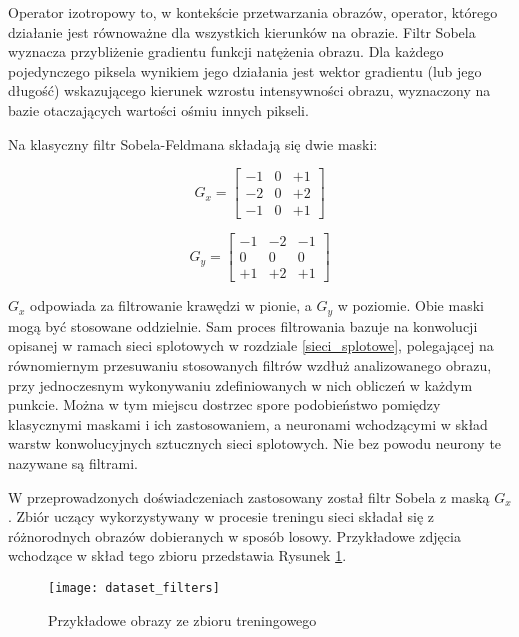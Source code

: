     Operator izotropowy to, w kontekście przetwarzania obrazów, operator, którego
    działanie jest równoważne dla wszystkich kierunków na obrazie. Filtr Sobela
    wyznacza przybliżenie gradientu funkcji natężenia obrazu. Dla każdego pojedynczego
    piksela wynikiem jego działania jest wektor gradientu (lub jego długość) wskazującego kierunek wzrostu
    intensywności obrazu, wyznaczony na bazie otaczających wartości ośmiu innych pikseli.

    Na klasyczny filtr Sobela-Feldmana składają się dwie maski:

    \[G_x =
    \begin{bmatrix}
    -1 & 0 & +1 \\
    -2 & 0 & +2 \\
    -1 & 0 & +1
    \end{bmatrix}
    \]

    \[G_y =
    \begin{bmatrix}
    -1 & -2 & -1 \\
    0 & 0 & 0 \\
    +1 & +2 & +1
    \end{bmatrix}
    \]

    $G_x$ odpowiada za filtrowanie krawędzi w pionie, a $G_y$ w poziomie. Obie maski
    mogą być stosowane oddzielnie. Sam proces filtrowania bazuje na konwolucji
    opisanej w ramach sieci splotowych w rozdziale \ref{sieci_splotowe}, polegającej na
    równomiernym przesuwaniu stosowanych filtrów wzdłuż analizowanego obrazu, przy
    jednoczesnym wykonywaniu zdefiniowanych w nich obliczeń w każdym punkcie. Można
    w tym miejscu dostrzec spore podobieństwo pomiędzy klasycznymi maskami i ich zastosowaniem,
    a neuronami wchodzącymi w skład warstw konwolucyjnych sztucznych sieci splotowych. Nie bez powodu
    neurony te nazywane są filtrami.

    W przeprowadzonych doświadczeniach zastosowany został filtr Sobela z
    maską $G_x$. Zbiór uczący wykorzystywany w procesie treningu sieci składał się
    z różnorodnych obrazów dobieranych w sposób losowy. Przykładowe zdjęcia wchodzące
    w skład tego zbioru przedstawia Rysunek \ref{fig:dataset_filters}.

    \begin{figure}[H]
      \centering
      \texttt{[image: dataset\_filters]}
      \caption[Przykładowe obrazy ze zbioru treningowego - źródło: Rysunek własny]{Przykładowe obrazy ze zbioru treningowego}
      \label{fig:dataset_filters}
    \end{figure}

